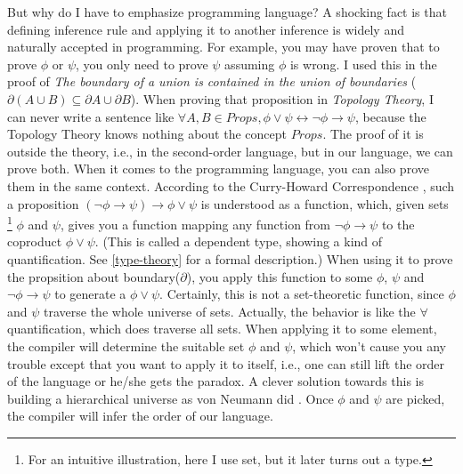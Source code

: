\documentclass[12pt,a4paper]{report}
\begin{document}
But why do I have to emphasize programming language? A shocking fact is 
that defining inference rule and applying it to another inference is 
widely and naturally accepted in programming. For example, you may have
proven that to prove $\phi$ or $\psi$, you only need to prove $\psi$ 
assuming $\phi$ is wrong. I used this in the proof of 
{\it The boundary of a union is contained in the union of boundaries} 
($\partial(A\cup B)\subseteq \partial A \cup\partial B$). 
When proving that proposition in {\it Topology Theory}, I can never 
write a sentence like $\forall A,B\in Props,\phi\vee\psi \leftrightarrow
\neg\phi\rightarrow\psi$, because the Topology Theory knows nothing
about the concept $Props$. The proof of it is outside the theory,
i.e., in the second-order language, but in our language, we can
prove both. When it comes to the programming language, you can also
prove them in the same context. According to the Curry-Howard 
Correspondence \cite{Curry-Howard,Curry-Howard-Scheme}, such a
proposition $(\neg\phi\to\psi)\to\phi\vee\psi$ is understood as a 
function, which, given sets \footnote{For an intuitive illustration, 
here I use set, but it later turns out a type.} $\phi$ and $\psi$, 
gives you a function mapping any function from 
$\neg\phi\to\psi$ to the coproduct $\phi\vee\psi$. (This is 
called a dependent type, showing a kind of quantification. See 
\autoref{type-theory} for a formal description.) When using it to
prove the propsition about boundary($\partial$), you apply this
function to some $\phi$, $\psi$ and $\neg\phi\to\psi$ to generate
a $\phi\vee\psi$. Certainly, this is not a set-theoretic function,
since $\phi$ and $\psi$ traverse the whole universe of sets. Actually,
the behavior is like the $\forall$ quantification, which does traverse
all sets. When applying it to some element, the compiler will determine
the suitable set $\phi$ and $\psi$, which won't cause you any trouble
except that you want to apply it to itself, i.e., one can still lift
the order of the language or he/she gets the paradox. A clever solution 
towards this is building a hierarchical universe as von Neumann did 
\cite{von-Neumann-universe}. Once $\phi$ and $\psi$ are picked, the 
compiler will infer the order of our language. 
\end{document}
